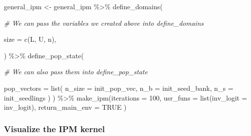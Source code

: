 \documentclass[
]{article}
\newenvironment{Shaded}{\begin{snugshade}}{\end{snugshade}}
\newcommand{\AttributeTok}[1]{\textcolor[rgb]{0.77,0.63,0.00}{#1}}
\newcommand{\CommentTok}[1]{\textcolor[rgb]{0.56,0.35,0.01}{\textit{#1}}}
\newcommand{\ConstantTok}[1]{\textcolor[rgb]{0.00,0.00,0.00}{#1}}
\newcommand{\DecValTok}[1]{\textcolor[rgb]{0.00,0.00,0.81}{#1}}
\newcommand{\DocumentationTok}[1]{\textcolor[rgb]{0.56,0.35,0.01}{\textbf{\textit{#1}}}}
\newcommand{\FunctionTok}[1]{\textcolor[rgb]{0.00,0.00,0.00}{#1}}
\newcommand{\NormalTok}[1]{#1}
\newcommand{\OtherTok}[1]{\textcolor[rgb]{0.56,0.35,0.01}{#1}}
\newcommand{\SpecialCharTok}[1]{\textcolor[rgb]{0.00,0.00,0.00}{#1}}
\begin{document}
\begin{Shaded}
\begin{Highlighting}[]
\NormalTok{general\_ipm }\OtherTok{\textless{}{-}}\NormalTok{ general\_ipm }\SpecialCharTok{\%\textgreater{}\%}
  \FunctionTok{define\_domains}\NormalTok{(}
    
    \CommentTok{\# We can pass the variables we created above into define\_domains}
    
    \AttributeTok{size =} \FunctionTok{c}\NormalTok{(L, U, n),}
    
\NormalTok{  ) }\SpecialCharTok{\%\textgreater{}\%}
  \FunctionTok{define\_pop\_state}\NormalTok{(}
    
    \CommentTok{\# We can also pass them into define\_pop\_state}
    
    \AttributeTok{pop\_vectors =} \FunctionTok{list}\NormalTok{(}
      \AttributeTok{n\_size =}\NormalTok{ init\_pop\_vec,}
      \AttributeTok{n\_b  =}\NormalTok{ init\_seed\_bank,}
      \AttributeTok{n\_s  =}\NormalTok{ init\_seedlings }
\NormalTok{    )}
\NormalTok{  ) }\SpecialCharTok{\%\textgreater{}\%}
  \FunctionTok{make\_ipm}\NormalTok{(}\AttributeTok{iterations =} \DecValTok{100}\NormalTok{,}
           \AttributeTok{usr\_funs =} \FunctionTok{list}\NormalTok{(}\AttributeTok{inv\_logit   =}\NormalTok{ inv\_logit), }\AttributeTok{return\_main\_env =} \ConstantTok{TRUE}\NormalTok{ )}
\end{Highlighting}
\end{Shaded}

\hypertarget{visualize-the-ipm-kernel}{%
\subsubsection{Visualize the IPM
kernel}\label{visualize-the-ipm-kernel}}

\begin{Shaded}
\end{Shaded}
\end{document}
